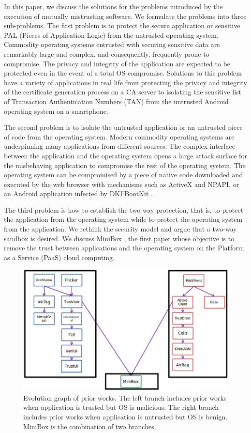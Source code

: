 In this paper, we discuss the solutions for the problems introduced by the
execution of mutually mistrusting software. We formulate the problems into
three sub-problems. The first problem is to protect the secure application or
sensitive PAL (Pieces of Application Logic) from the untrusted operating
system. Commodity operating systems entrusted with securing sensitive data are
remarkably large and complex, and consequently, frequently prone to compromise.
The privacy and integrity of the application are expected to be protected even
in the event of a total OS compromise. Solutions to this problem have a variety
of applications in real life from protecting the privacy and integrity of the
certificate generation process on a CA server to isolating the sensitive list
of Transaction Authentication Numbers (TAN) from the untrusted Android
operating system on a smartphone.

The second problem is to isolate the untrusted application or an untrusted
piece of code from the operating system. Modern commodity operating systems are
underpinning many applications from different sources. The complex interface
between the application and the operating system opens a large attack surface
for the misbehaving application to compromise the rest of the operating system.
The operating system can be compromised by a piece of native code downloaded
and executed by the web browser with mechanisms such as ActiveX and NPAPI, or
an Android application infected by DKFBootKit \cite{DKFBootKit}.

The third problem is how to establish the two-way protection, that is, to
protect the application from the operating system while to protect the
operating system from the application. We rethink the security model and argue
that a two-way sandbox is desired.  We discuss MiniBox \cite{MiniBox}, the
first paper whose objective is to remove the trust between applications and the
operating system on the Platform as a Service (PaaS) cloud computing.

\begin{figure}[htb]
\centering
\includegraphics[width=\columnwidth]{figures/evolution.eps}
\caption{Evolution graph of prior works. The left branch includes prior works
when application is trusted but OS is malicious. The right branch includes
prior works when application is untrusted but OS is benign. MiniBox is the
combination of two branches.}
\label{fig:evolution}
\end{figure}


